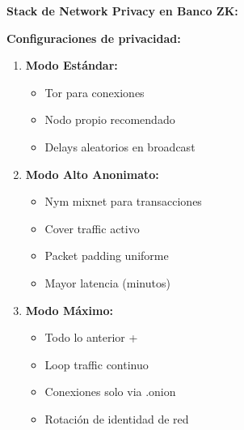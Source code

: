 \documentclass[11pt,a4paper,twoside]{book}
\theoremstyle{definition}
\theoremstyle{remark}
\begin{document}
\begin{bancozk}
\textbf{Stack de Network Privacy en Banco ZK:}

\begin{center}
\end{center}

\textbf{Configuraciones de privacidad:}

\begin{enumerate}
    \item \textbf{Modo Estándar:}
    \begin{itemize}
        \item Tor para conexiones
        \item Nodo propio recomendado
        \item Delays aleatorios en broadcast
    \end{itemize}
    
    \item \textbf{Modo Alto Anonimato:}
    \begin{itemize}
        \item Nym mixnet para transacciones
        \item Cover traffic activo
        \item Packet padding uniforme
        \item Mayor latencia (minutos)
    \end{itemize}
    
    \item \textbf{Modo Máximo:}
    \begin{itemize}
        \item Todo lo anterior +
        \item Loop traffic continuo
        \item Conexiones solo via .onion
        \item Rotación de identidad de red
    \end{itemize}
\end{enumerate}


\end{bancozk}
\end{document}
